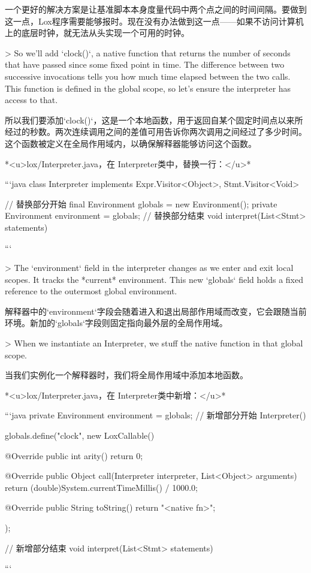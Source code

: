 \documentclass[cn,11pt,chinese]{elegantbook}
\begin{document}
{一个更好的解决方案是让基准脚本本身度量代码中两个点之间的时间间隔。要做到这一点，Lox程序需要能够报时。现在没有办法做到这一点——如果不访问计算机上的底层时钟，就无法从头实现一个可用的时钟。

> So we’ll add `clock()`, a native function that returns the number of seconds that have passed since some fixed point in time. The difference between two successive invocations tells you how much time elapsed between the two calls. This function is defined in the global scope, so let’s ensure the interpreter has access to that.

所以我们要添加`clock()`，这是一个本地函数，用于返回自某个固定时间点以来所经过的秒数。两次连续调用之间的差值可用告诉你两次调用之间经过了多少时间。这个函数被定义在全局作用域内，以确保解释器能够访问这个函数。

*<u>lox/Interpreter.java，在 Interpreter类中，替换一行：</u>*

```java
class Interpreter implements Expr.Visitor<Object>,
                             Stmt.Visitor<Void> {
  // 替换部分开始                           
  final Environment globals = new Environment();
  private Environment environment = globals;
  // 替换部分结束
  void interpret(List<Stmt> statements) {
```

> The `environment` field in the interpreter changes as we enter and exit local scopes. It tracks the *current* environment. This new `globals` field holds a fixed reference to the outermost global environment.

解释器中的`environment`字段会随着进入和退出局部作用域而改变，它会跟随当前环境。新加的`globals`字段则固定指向最外层的全局作用域。

> When we instantiate an Interpreter, we stuff the native function in that global scope.

当我们实例化一个解释器时，我们将全局作用域中添加本地函数。

*<u>lox/Interpreter.java，在 Interpreter类中新增：</u>*

```java
  private Environment environment = globals;
  // 新增部分开始
  Interpreter() {
    globals.define("clock", new LoxCallable() {
      @Override
      public int arity() { return 0; }

      @Override
      public Object call(Interpreter interpreter,
                         List<Object> arguments) {
        return (double)System.currentTimeMillis() / 1000.0;
      }

      @Override
      public String toString() { return "<native fn>"; }
    });
  }
  // 新增部分结束
  void interpret(List<Stmt> statements) {
```

}}}}
\end{document}
